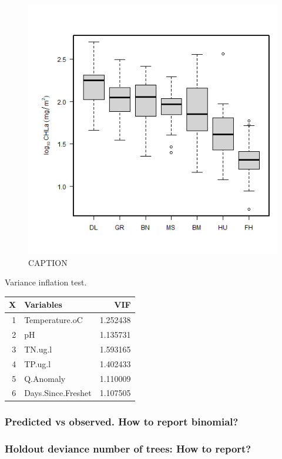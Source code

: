 \documentclass[
]{article}
\begin{document}
\begin{figure}
\centering
\includegraphics{Manuscript_files/FIGURES/test.png}
\caption{CAPTION}
\end{figure}

Variance inflation test.

\begin{longtable}[]{@{}rlr@{}}
\toprule()
X & Variables & VIF \\
\midrule()
\endhead
1 & Temperature.oC & 1.252438 \\
2 & pH & 1.135731 \\
3 & TN.ug.l & 1.593165 \\
4 & TP.ug.l & 1.402433 \\
5 & Q.Anomaly & 1.110009 \\
6 & Days.Since.Freshet & 1.107505 \\
\bottomrule()
\end{longtable}

\hypertarget{predicted-vs-observed.-how-to-report-binomial}{%
\subsubsection{Predicted vs observed. How to report
binomial?}\label{predicted-vs-observed.-how-to-report-binomial}}

\hypertarget{holdout-deviance-number-of-trees-how-to-report}{%
\subsubsection{Holdout deviance number of trees: How to
report?}\label{holdout-deviance-number-of-trees-how-to-report}}
\end{document}
